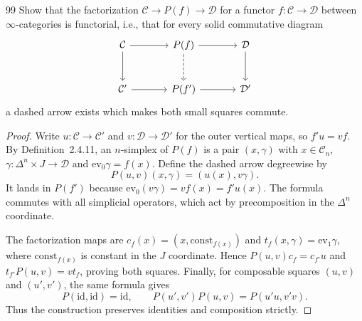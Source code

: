 \begin{exercise}{99}
Show that the factorization $\mathcal C\to P(f)\to\mathcal D$ for a functor
$f\colon\mathcal C\to\mathcal D$ between $\infty$-categories is functorial, i.e.,
that for every solid commutative diagram
\[
\begin{tikzcd}[column sep=large,row sep=large]
 \mathcal C \arrow[r] \arrow[d] & P(f) \arrow[r] \arrow[d,dashed]
   & \mathcal D \arrow[d] \\
 \mathcal C' \arrow[r] & P(f') \arrow[r] & \mathcal D'
\end{tikzcd}
\]
a dashed arrow exists which makes both small squares commute.

\begin{proof}
Write $u\colon\mathcal C\to\mathcal C'$ and
$v\colon\mathcal D\to\mathcal D'$ for the outer vertical maps, so
$f'u=vf$.
By Definition~2.4.11, an $n$-simplex of $P(f)$ is a pair
$(x,\gamma)$ with $x\in\mathcal C_n$,
$\gamma\colon\Delta^n\times J\to\mathcal D$ and
$\mathrm{ev}_0\gamma=f(x)$.
Define the dashed arrow degreewise by
\[
 P(u,v)(x,\gamma)=(u(x),v\gamma).
\]
It lands in $P(f')$ because
$\mathrm{ev}_0(v\gamma)=vf(x)=f'u(x)$.
The formula commutes with all simplicial operators, which act by
precomposition in the $\Delta^n$ coordinate.

The factorization maps are
$c_f(x)=(x,\mathrm{const}_{f(x)})$ and
$t_f(x,\gamma)=\mathrm{ev}_1\gamma$, where
$\mathrm{const}_{f(x)}$ is constant in the $J$ coordinate.
Hence $P(u,v)c_f=c_{f'}u$ and $t_{f'}P(u,v)=vt_f$, proving both squares.
Finally, for composable squares $(u,v)$ and $(u',v')$, the same formula gives
\[
 P(\mathrm{id},\mathrm{id})=\mathrm{id},\qquad
 P(u',v')P(u,v)=P(u'u,v'v).
\]
Thus the construction preserves identities and composition strictly.
\end{proof}
\end{exercise}
